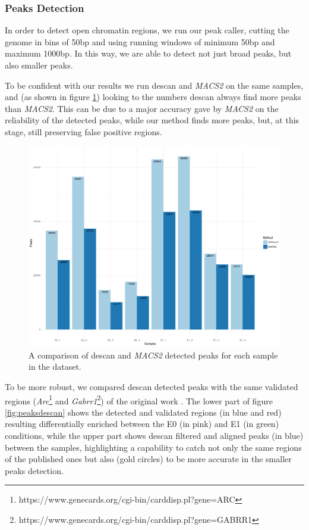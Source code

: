 \subsubsection{Peaks Detection}

In order to detect open chromatin regions, we run our peak caller, cutting the genome in bins of 50bp and using running windows of minimum 50bp and maximum 1000bp.
In this way, we are able to detect not just broad peaks, but also smaller peaks.

To be confident with our results we run \gls{descan} and \textit{MACS2}  \cite{Zhang2008} on the same samples, and (as shown in figure \ref{fig:des2m2peaks}) looking to the numbers \gls{descan} always find more peaks than \textit{MACS2}.
This can be due to a major accuracy gave by \textit{MACS2} on the reliability of the detected peaks, while our method finds more peaks, but, at this stage, still preserving false positive regions.

\begin{figure}[H]
\centering
\includegraphics[width=12cm, keepaspectratio]{img/descan2/d2m2_peaks_number.png}
\caption[The DEScan2 and \textit{MACS2} peaks detection]{A comparison of \gls{descan} and \textit{MACS2} detected peaks for each sample in the dataset.}
\label{fig:des2m2peaks}

\end{figure}

To be more robust, we compared \gls{descan} detected peaks with the same validated regions (\textit{Arc}\footnote{https://www.genecards.org/cgi-bin/carddisp.pl?gene=ARC} and \textit{Gabrr1}\footnote{https://www.genecards.org/cgi-bin/carddisp.pl?gene=GABRR1}) of the original work \cite{Su2017}.
The lower part of figure \ref{fig:peaksdescan} shows the detected and validated regions (in blue and red) resulting differentially enriched between the E0 (in pink) and E1 (in green) conditions, while the upper part shows \gls{descan} filtered and aligned peaks (in blue) between the samples, highlighting a capability to catch not only the same regions of the published ones but also (gold circles) to be more accurate in the smaller peaks detection.


